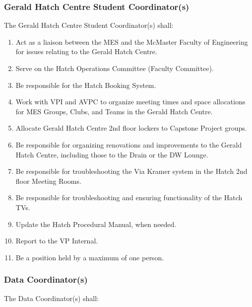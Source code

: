 \subsubsection{Gerald Hatch Centre Student Coordinator(s)}
\label{gerald-hatch-centre-student-coordinators}
The Gerald Hatch Centre Student Coordinator(s) shall:

\begin{enumerate}
 \item
  Act as a liaison between the MES and the McMaster Faculty of Engineering for issues relating to the Gerald Hatch Centre.
 \item
  Serve on the Hatch Operations Committee (Faculty Committee).
 \item
  Be responsible for the Hatch Booking System.
 \item
  Work with VPI and AVPC to organize meeting times and space allocations for MES Groups, Clubs, and Teams in the Gerald Hatch Centre.
 \item
  Allocate Gerald Hatch Centre 2nd floor lockers to Capstone Project groups.
 \item
  Be responsible for organizing renovations and improvements to the Gerald Hatch Centre, including those to the Drain or the DW Lounge.
 \item
  Be responsible for troubleshooting the Via Kramer system in the Hatch 2nd floor Meeting Rooms.
 \item
  Be responsible for troubleshooting and ensuring functionality of the Hatch TVs.
 \item
  Update the Hatch Procedural Manual, when needed.
 \item
  Report to the VP Internal.
 \item
  Be a position held by a maximum of one person.

\end{enumerate}

\subsubsection{Data Coordinator(s)}
\label{data-coordinators}
The Data Coordinator(s) shall:

